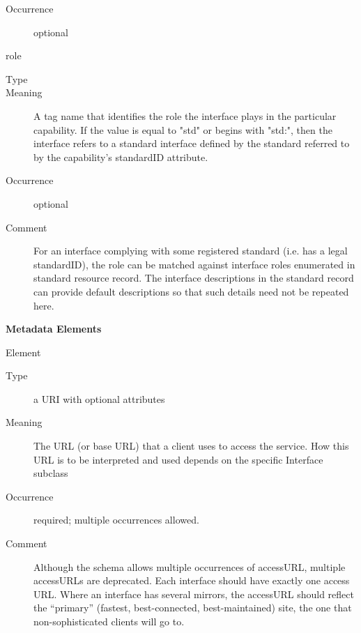 \documentclass[11pt,a4paper]{ivoa}
\begin{document}
\begin{generated}
\begin{bigdescription}
\begin{description}
\item[Occurrence] optional
\end{description}
\item[role]
\begin{description}
\item[Type] 
\item[Meaning]
               A tag name that identifies the role the interface plays
               in the particular capability.  If the value is equal to
               {"}std{"} or begins with {"}std:{"}, then the interface refers
               to a standard interface defined by the standard
               referred to by the capability's standardID attribute.

\item[Occurrence] optional
\item[Comment]
               For an interface complying with some registered
               standard (i.e. has a legal standardID), the role can be
               matched against interface roles enumerated in standard
               resource record.  The interface descriptions in
               the standard record can provide default descriptions
               so that such details need not be repeated here.

\end{description}


\end{bigdescription}\endgroup



\vspace{0.5ex}\noindent\textbf{ Metadata Elements}

\begingroup\small\begin{bigdescription}\item[Element \xmlel{accessURL}]
\begin{description}
\item[Type] a URI with optional attributes
\item[Meaning]
                 The URL (or base URL) that a client uses to access the
                 service.  How this URL is to be interpreted and used
                 depends on the specific Interface subclass

\item[Occurrence] required; multiple occurrences allowed.
\item[Comment]
                 Although the schema allows multiple occurrences of
                 accessURL, multiple accessURLs are deprecated.  Each
                 interface should have exactly one access URL.  Where an
                 interface has several mirrors, the  accessURL should
                 reflect the “primary” (fastest, best-connected,
                 best-maintained) site, the one that non-sophisticated
                 clients will go to.


\end{description}
\end{bigdescription}
\end{generated}
\end{document}
